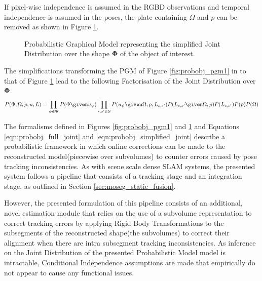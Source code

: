 If pixel-wise independence is assumed in the RGBD observations and temporal
independence is assumed in the poses, the plate containing $\Omega$ and $p$ can
be removed as shown in Figure \ref{fig:probobj_pgm2}.
\begin{figure}[ht]
  \label{fig:probobj_pgm2}
  \centering
  \caption{Probabilistic Graphical Model representing the simplified Joint
    Distribution over the shape $\mathbf{\Phi}$ of the object of interest.}
\end{figure}

The simplifications transforming the PGM of Figure \ref{fig:probobj_pgm1} in to
that of Figure \ref{fig:probobj_pgm2} lead to the following Factorisation of the
Joint Distribution over $\mathbf{\Phi}$.
\begin{equation}
  \label{eqn:probobj_simplified_joint}
  P(\Phi, \Omega, p, u, L) = 
  \prod_{\psi \in \mathbf{\Psi}}P(\Phi \given u_{\psi})
  \prod_{s, s' \in \mathcal{S}}P(u_{\psi} \given \Omega, p, L_{s, s'})
  P(L_{s, s'} \given \Omega, p) P(L_{s, s'})P(p)P(\Omega)
\end{equation}

The formalisms defined in Figures \ref{fig:probobj_pgm1} and
\ref{fig:probobj_pgm2} and Equations \ref{eqn:probobj_full_joint} and
\ref{eqn:probobj_simplified_joint} describe a probabilistic framework in which
online corrections can be made to the reconstructed model(piecewise over
subvolumes) to counter errors caused by pose tracking inconsistencies. As with
scene scale dense SLAM systems\cite{Newcombe2011, Prisacariu2014, Niessner2013},
the presented system follows a pipeline that consists of a tracking stage and an
integration stage, as outlined in Section \ref{sec:moseg_static_fusion}.

However, the presented formulation of this pipeline consists of an
additional, novel estimation module that relies on the use of a subvolume
representation to correct tracking errors by applying Rigid Body Transformations
to the subsegments of the reconstructed shape(the subvolumes) to correct their
alignment when there are intra subsegment tracking inconsistencies. As inference
on the Joint Distribution of the presented Probabilistic Model model is
intractable, Conditional Independence assumptions are made that empirically do
not appear to cause any functional issues.

